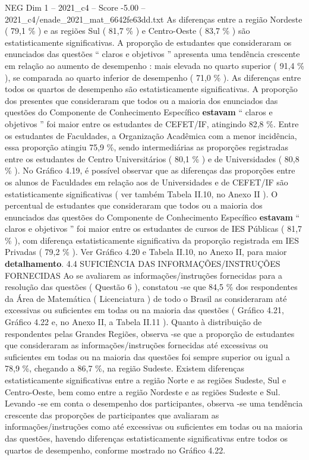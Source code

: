 \begin{textsample}{NEG Dim 1 – 2021\_c4 – Score -5.00 – 2021\_c4/enade\_2021\_mat\_6642fe63dd.txt}
As diferenças entre a região Nordeste ( 79,1 \% ) e as regiões Sul ( 81,7 \% ) e Centro-Oeste ( 83,7 \% ) são estatisticamente significativas.
A proporção de estudantes que consideraram os enunciados das questões “ claros e objetivos ” apresenta uma tendência crescente em relação ao aumento de desempenho : mais elevada no quarto superior ( 91,4 \% ), se comparada ao quarto inferior de desempenho ( 71,0 \% ).
As diferenças entre todos os quartos de desempenho são estatisticamente significativas.
A proporção dos presentes que consideraram que todos ou a maioria dos enunciados das questões do Componente de Conhecimento Específico \textbf{estavam} “ claros e objetivos ” foi maior entre os estudantes de CEFET/IF, atingindo 82,8 \%.
Entre os estudantes de Faculdades, a Organização Acadêmica com a menor incidência, essa proporção atingiu 75,9 \%, sendo intermediárias as proporções registradas entre os estudantes de Centro Universitários ( 80,1 \% ) e de Universidades ( 80,8 \% ).
No Gráfico 4.19, é possível observar que as diferenças das proporções entre os alunos de Faculdades em relação aos de Universidades e de CEFET/IF são estatisticamente significativas ( ver também Tabela II.10, no Anexo II ).
O percentual de estudantes que consideraram que todos ou a maioria dos enunciados das questões do Componente de Conhecimento Específico \textbf{estavam} “ claros e objetivos ” foi maior entre os estudantes de cursos de IES Públicas ( 81,7 \% ), com diferença estatisticamente significativa da proporção registrada em IES Privadas ( 79,2 \% ).
Ver Gráfico 4.20 e Tabela II.10, no Anexo II, para maior \textbf{detalhamento}. 4.4 SUFICIÊNCIA DAS INFORMAÇÕES/INSTRUÇÕES FORNECIDAS Ao se avaliarem as informações/instruções fornecidas para a resolução das questões ( Questão 6 ), constatou -se que 84,5 \% dos respondentes da Área de Matemática ( Licenciatura ) de todo o Brasil as consideraram até excessivas ou suficientes em todas ou na maioria das questões ( Gráfico 4.21, Gráfico 4.22 e, no Anexo II, a Tabela II.11 ).
Quanto à distribuição de respondentes pelas Grandes Regiões, observa -se que a proporção de estudantes que consideraram as informações/instruções fornecidas até excessivas ou suficientes em todas ou na maioria das questões foi sempre superior ou igual a 78,9 \%, chegando a 86,7 \%, na região Sudeste.
Existem diferenças estatisticamente significativas entre a região Norte e as regiões Sudeste, Sul e Centro-Oeste, bem como entre a região Nordeste e as regiões Sudeste e Sul.
Levando -se em conta o desempenho dos participantes, observa -se uma tendência crescente das proporções de participantes que avaliaram as informações/instruções como até excessivas ou suficientes em todas ou na maioria das questões, havendo diferenças estatisticamente significativas entre todos os quartos de desempenho, conforme mostrado no Gráfico 4.22.

\end{textsample}
